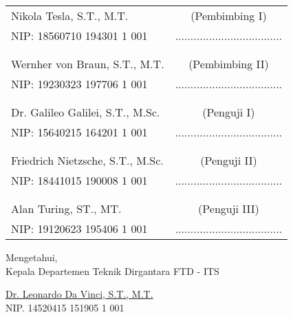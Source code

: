   \begin{center}
    \begin{tabularx}{\textwidth}{Xc}
      Nikola Tesla, S.T., M.T.          & (Pembimbing I) \\
      NIP: 18560710 194301 1 001        & ................................... \\
      &  \\
      &  \\
      Wernher von Braun, S.T., M.T.     & (Pembimbing II) \\
      NIP: 19230323 197706 1 001        & ................................... \\
      &  \\
      &  \\
      Dr. Galileo Galilei, S.T., M.Sc.  & (Penguji I) \\
      NIP: 15640215 164201 1 001        & ................................... \\
      &  \\
      &  \\
      Friedrich Nietzsche, S.T., M.Sc.  & (Penguji II) \\
      NIP: 18441015 190008 1 001        & ................................... \\
      &  \\
      &  \\
      Alan Turing, ST., MT.             & (Penguji III) \\
      NIP: 19120623 195406 1 001        & ................................... \\
    \end{tabularx}
  \end{center}

  \vspace{2ex}

  \begin{center}
    Mengetahui, \\
    Kepala Departemen Teknik Dirgantara FTD - ITS \\

    \vspace{8ex}

    \underline{Dr. Leonardo Da Vinci, S.T., M.T.} \\
    NIP. 14520415 151905 1 001
  \end{center}
\endgroup
